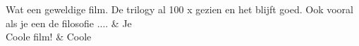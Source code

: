 \begin{table}[h]
\begin{tabu}
Wat een geweldige film. De trilogy al 100 x gezien en het blijft goed. Ook vooral als je een de filosofie ....                                                                                                                                                                                                                                                                                                                                                                                                                                                                                                                                                                                                                                                                                                                                                                                                                                                         & Je                                   \\ \hline
Coole film!                                                                                                                                                                                                                                                                                                                                                                                                                                                                                                                                                                                                                                                                                                                                                                                                                                                                                                                                                                                                                                                                                                                                                                                                                                                                                                                                                                                                                                                                                     & Coole                                \\ \hline

\end{tabu}
\end{table}

